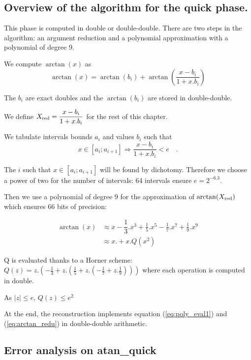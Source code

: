 \subsection{Overview of the algorithm for the quick phase.}

This phase is computed in double or double-double. There are two steps
in the algorithm: an argument reduction and a polynomial approximation
with a polynomial of degree 9.

We compute $\arctan(x)$ as 
\begin{equation}
\arctan(x) = \arctan( b_i ) + \arctan(\frac{x-b_i}{1+x.b_i}) \label{eq:arctan_redu}
\end{equation}

The $b_i$ are exact doubles and the $\arctan(b_i)$ are stored in
double-double.

We define $X_{\mathrm{red}} = \dfrac{x-b_i}{1+x.b_i}$ for the rest of this chapter.

We tabulate intervals bounds $a_i$ and values $b_i$ such
that 
\begin{equation}
 x \in [a_i;a_{i+1}] \Rightarrow \dfrac{x-b_i}{1+x.b_i} < e \quad .
\label{atan_ineq_interval}
\end{equation}

The $i$ such that $x \in [a_i;a_{i+1}]$ will be found by dichotomy.
Therefore we choose a power of two for the number of intervals: 64
intervals ensure $e=2^{-6.3}$.

Then we use a polynomial of degree 9 for the approximation of $\arctan(X_{\mathrm{red}})$
which ensures 66 bits of precision:

\begin{equation}
\begin{split} \arctan(x)& \approx x - \dfrac{1}{3} .x^3 + \frac{1}{5}.x^5
- \frac{1}{7}.x^7 + \frac{1}{9}.x^9 \nonumber \\ 
  & \approx x . + x.Q(x^2)
\end{split}
\label{eq:poly_eval1}
\end{equation}
 
Q is evaluated thanks to a Horner scheme:
$ Q(z) = z. (-\frac{1}{3} + z.(\frac{1}{5} + z.(-\frac{1}{7} +
z.\frac{1}{9}))) $
where each operation is computed in double.

As $|z| \leq e$, $Q(z) \leq e^2$

At the end, the reconstruction implements equation
(\ref{eq:poly_eval1}) and (\ref{eq:arctan_redu}) in double-double
arithmetic.


\subsection{Error analysis on atan\_quick}


